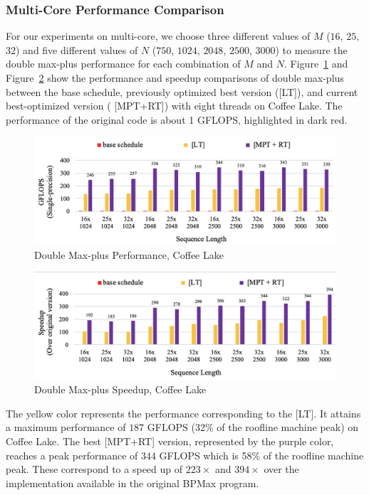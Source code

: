 \subsubsection{Multi-Core Performance Comparison}
For our experiments on multi-core, we choose three different values of $M$ ($16$, $25$, $32$) and five different values of $N$ ($750$, $1024$, $2048$, $2500$, $3000$) to measure the double max-plus performance for each combination of $M$ and $N$. Figure~\ref{fig:peroformance_analysis_double_max_plus} and Figure~\ref{fig:double_max_plus_speed_up} show the performance and speedup comparisons of double max-plus between the base schedule, previously optimized best version ([LT]), and current best-optimized version ( [MPT+RT]) with eight threads on Coffee Lake. The performance of the original code is about 1 GFLOPS, highlighted in dark red.
\begin{figure}[htbp]
\centerline{\includegraphics[scale=0.42, trim=5 5 5 5,clip]{content/figures/dpm_performance_new.png}}
\caption{Double Max-plus Performance, Coffee Lake }
\label{fig:peroformance_analysis_double_max_plus}
\end{figure}
\begin{figure}[htbp]
\centerline{\includegraphics[scale=0.42, trim=5 5 5 5,clip]{content/figures/dpm_speedup_new.png}}
\caption{Double Max-plus Speedup, Coffee Lake}
\label{fig:double_max_plus_speed_up}
\end{figure}
The yellow color represents the performance corresponding to the [LT]. It attains a maximum performance of $187$ GFLOPS (32\% of the roofline machine peak) on Coffee Lake. The best [MPT+RT] version, represented by the purple color, reaches a peak performance of $344$ GFLOPS which is 58\% of the roofline machine peak. These correspond to a speed up of $223\times$ and $394\times$  over the implementation available in the original BPMax program.




